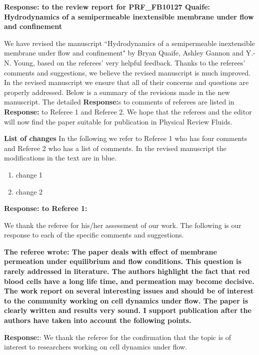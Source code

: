 \documentclass[12pt]{article}
\begin{document}
{\large \bf {\bf Response:} to the review report for PRF\_FB10127 Quaife: Hydrodynamics of a semipermeable inextensible membrane under flow and confinement}
\vspace{0.5cm}

We have revised the manuscript ``Hydrodynamics of a semipermeable inextensible membrane under flow and confinement"  
by Bryan Quaife, Ashley Gannon and Y.-N. Young, 
based on 
the referees' very helpful feedback.  
Thanks to the referees' comments
and suggestions, we believe the revised manuscript is much
improved. 
In the revised manuscript we ensure that
all of their concerns and questions are properly addressed.
Below is a summary of the revisions made in the new manuscript.
The detailed {\bf Response:}s to comments of referees are listed in 
{\bf Response:} to Referee 1 and Referee 2.
We hope that the referees and the
editor will now find the paper suitable for publication in 
Physical Review Fluids.

\vspace{0.5cm}
{\large \bf List of changes}
In the following we refer to 
Referee 1 who has four comments and Referee 2 who has a list of comments. In the revised manuscript the modifications in the text are in blue.

\begin{enumerate}
\item{change 1}
\item{change 2}
\end{enumerate}

\newpage
\vspace{0.5cm}
{\large \bf {\bf Response:} to Referee 1:}
\vspace{0.5cm}

We thank the referee for his/her assessment of our work.  
The following is
our response to each of the specific comments and suggestions.


{\bf The referee wrote:
The paper deals with effect of membrane permeation under equilibrium
and flow conditions. This question is rarely addressed in literature.
The authors highlight the fact that red blood cells have a long life
time, and permeation may become decisive. The work report on several
interesting issues and should be of interest to the community working
on cell dynamics under flow. The paper is clearly written and results
very sound. I support publication after the authors have taken into
account the following points.
}

\noindent
{\bf Response:}: We thank the referee for the confirmation that the topic is of interest to researchers working on cell dynamics under flow.
\end{document}

